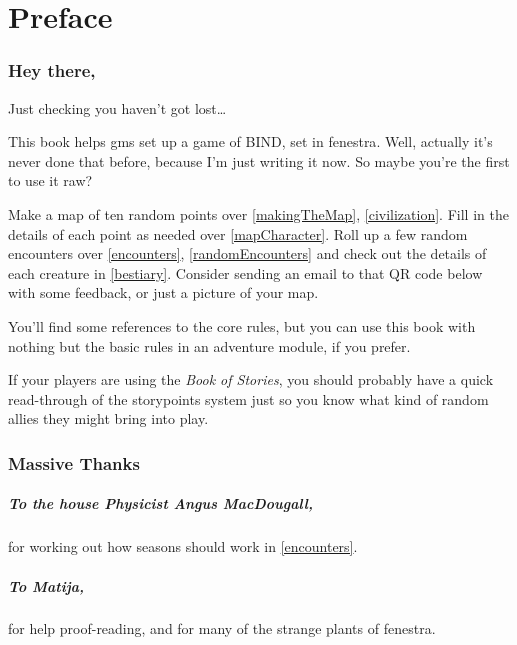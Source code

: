 \chapter{Preface}

\begin{multicols}{2}

\subsection{Hey there,}

Just checking you haven't got lost\ldots

This book helps \glspl{gm} set up a game of BIND, set in \gls{fenestra}.
Well, actually it's never done that before, because I'm just writing it now.
So maybe you're the first to use it raw?

Make a map of ten random points over \autoref{makingTheMap}, \autoref{civilization}.
Fill in the details of each point as needed over \autoref{mapCharacter}.
Roll up a few random encounters over \autoref{encounters}, \autoref{randomEncounters} and check out the details of each creature in \autoref{bestiary}.
Consider sending an email to that QR code below with some feedback, or just a picture of your map.

You'll find some references to the core rules, but you can use this book with nothing but the basic rules in an adventure module, if you prefer.

If your players are using the \textit{Book of Stories}, you should probably have a quick read-through of the \glspl{storypoint} system%
just so you know what kind of random allies they might bring into play.

\columnbreak

\subsection{Massive Thanks}

\paragraph{To the house Physicist Angus MacDougall,}
for working out how seasons should work in \autoref{encounters}.

\paragraph{To Matija,}
for help proof-reading, and for many of the strange plants of \gls{fenestra}.


\end{multicols}
